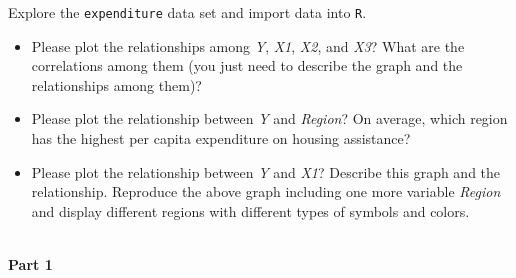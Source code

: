 \documentclass[12pt,letterpaper]{article}
\begin{document}
\vspace{.5cm}
\noindent Explore the \texttt{expenditure} data set and import data into \texttt{R}.
\vspace{.5cm}
\vspace{.5cm}
\begin{itemize}

\item
Please plot the relationships among \emph{Y}, \emph{X1}, \emph{X2}, and \emph{X3}? What are the correlations among them (you just need to describe the graph and the relationships among them)?
\vspace{.5cm}
\item
Please plot the relationship between \emph{Y} and \emph{Region}? On average, which region has the highest per capita expenditure on housing assistance?
\vspace{.5cm}
\item
Please plot the relationship between \emph{Y} and \emph{X1}? Describe this graph and the relationship. Reproduce the above graph including one more variable \emph{Region} and display different regions with different types of symbols and colors.
\end{itemize}

\newpage


 \\

\noindent \textbf {Part 1}
\end{document}
